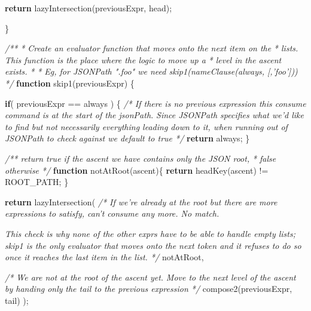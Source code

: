 \documentclass[12pt, ]{article}
\newenvironment{Shaded}{}{}
\newcommand{\KeywordTok}[1]{\textcolor[rgb]{0.00,0.44,0.13}{\textbf{{#1}}}}
\newcommand{\CommentTok}[1]{\textcolor[rgb]{0.38,0.63,0.69}{\textit{{#1}}}}
\newcommand{\FunctionTok}[1]{\textcolor[rgb]{0.02,0.16,0.49}{{#1}}}
\newcommand{\NormalTok}[1]{{#1}}
\begin{document}
\begin{Shaded}
\begin{Highlighting}[]
      \KeywordTok{return} \FunctionTok{lazyIntersection}\NormalTok{(previousExpr, head);}
            
   \NormalTok{\}            }
      
   \CommentTok{/**}
\CommentTok{    * Create an evaluator function that moves onto the next item on the }
\CommentTok{    * lists. This function is the place where the logic to move up a }
\CommentTok{    * level in the ascent exists. }
\CommentTok{    * }
\CommentTok{    * Eg, for JSONPath ".foo" we need skip1(nameClause(always, [,'foo']))}
\CommentTok{    */}
   \KeywordTok{function} \FunctionTok{skip1}\NormalTok{(previousExpr) \{}
   
   
      \KeywordTok{if}\NormalTok{( previousExpr == always ) \{}
         \CommentTok{/* If there is no previous expression this consume command }
\CommentTok{            is at the start of the jsonPath.}
\CommentTok{            Since JSONPath specifies what we'd like to find but not }
\CommentTok{            necessarily everything leading down to it, when running}
\CommentTok{            out of JSONPath to check against we default to true */}
         \KeywordTok{return} \NormalTok{always;}
      \NormalTok{\}}

      \CommentTok{/** return true if the ascent we have contains only the JSON root,}
\CommentTok{       *  false otherwise}
\CommentTok{       */}
      \KeywordTok{function} \FunctionTok{notAtRoot}\NormalTok{(ascent)\{}
         \KeywordTok{return} \FunctionTok{headKey}\NormalTok{(ascent) != ROOT_PATH;}
      \NormalTok{\}}
      
      \KeywordTok{return} \FunctionTok{lazyIntersection}\NormalTok{(}
               \CommentTok{/* If we're already at the root but there are more }
\CommentTok{                  expressions to satisfy, can't consume any more. No match.}

\CommentTok{                  This check is why none of the other exprs have to be able }
\CommentTok{                  to handle empty lists; skip1 is the only evaluator that }
\CommentTok{                  moves onto the next token and it refuses to do so once it }
\CommentTok{                  reaches the last item in the list. */}
               \NormalTok{notAtRoot,}
               
               \CommentTok{/* We are not at the root of the ascent yet.}
\CommentTok{                  Move to the next level of the ascent by handing only }
\CommentTok{                  the tail to the previous expression */} 
               \FunctionTok{compose2}\NormalTok{(previousExpr, tail) }
      \NormalTok{);}
                                                                                                               

\end{Highlighting}
\end{Shaded}
\end{document}
